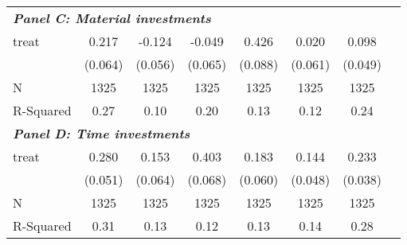 {\begin{tabular}{l*{7}{c}}
\hline
\multicolumn{6}{l}{\linebreak \textbf{\textit{Panel C: Material investments}}} \\
treat               &       0.217\sym{***}&      -0.124\sym{*}  &      -0.049         &       0.426\sym{***}&       0.020         &       0.098         \\
&     (0.064)         &     (0.056)         &     (0.065)         &     (0.088)         &     (0.061)         &     (0.049)         \\
\hline
N                   &        1325         &        1325         &        1325         &        1325         &        1325         &        1325         \\
R-Squared           &        0.27         &        0.10         &        0.20         &        0.13         &        0.12         &        0.24         \\
\hline
\multicolumn{6}{l}{\linebreak \textbf{\textit{Panel D: Time investments}}} \\
treat               &       0.280\sym{***}&       0.153\sym{*}  &       0.403\sym{***}&       0.183\sym{**} &       0.144\sym{**} &       0.233\sym{***}\\
&     (0.051)         &     (0.064)         &     (0.068)         &     (0.060)         &     (0.048)         &     (0.038)         \\
\hline
N                   &        1325         &        1325         &        1325         &        1325         &        1325         &        1325         \\
R-Squared           &        0.31         &        0.13         &        0.12         &        0.13         &        0.14         &        0.28         \\
\hline\hline
\end{tabular}
}
